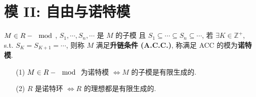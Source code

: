 \documentclass{note}
\begin{document}
\fi
\chapter{模 II: 自由与诺特模}
\begin{df}[诺特 (Notherian) 模]
    $M\in R-\mod$, $S_1,\cdots,S_n,\cdots$ 是 $M$ 的子模 且 $S_1\subseteq\cdots\subseteq S_n\subseteq\cdots$, 若 $\exists K\in\mathbb{Z}^+$, s.t. $S_K=S_{K+1}=\cdots$, 则称 $M$ 满足\textbf{升链条件 (A.C.C.)}, 称满足 ACC 的模为\textbf{诺特模}.
\end{df}

\begin{thm}[(课本定理 5.7)]
    \begin{itemize}
        \item[(1)] $M\in R-\mod$ 为诺特模 $\Longleftrightarrow M$ 的子模是有限生成的.
        \item[(2)] $R$ 是诺特环 $\Longleftrightarrow R$ 的理想都是有限生成的.
    \end{itemize}
\end{thm}
\end{document}
